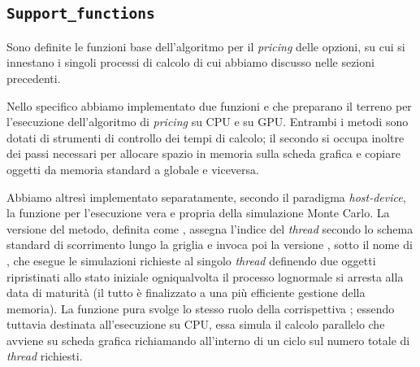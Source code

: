 \subsection{\texttt{Support\_functions}}
\label{sec:support_functions}
Sono definite  le funzioni base dell'algoritmo per il \textit{pricing} delle opzioni, su cui si innestano i singoli processi di calcolo di cui abbiamo discusso nelle sezioni precedenti.

Nello specifico abbiamo implementato due funzioni   e  che preparano il terreno per l'esecuzione dell'algoritmo di \textit{pricing} su CPU e su GPU. Entrambi i metodi sono dotati di strumenti di controllo dei tempi di calcolo; il secondo si occupa inoltre dei passi necessari per allocare spazio in memoria sulla scheda grafica e copiare oggetti da memoria standard a globale e viceversa. 

Abbiamo altresì implementato separatamente, secondo il paradigma \textit{host-device}, la funzione per l'esecuzione vera e propria della simulazione Monte Carlo. La versione  del metodo, definita come , assegna l'indice del \textit{thread} secondo lo schema standard di scorrimento lungo la griglia e invoca poi la versione , sotto il nome di , che esegue le simulazioni richieste al singolo \textit{thread} definendo due oggetti  ripristinati allo stato iniziale ogniqualvolta il processo lognormale si arresta alla data di maturità (il tutto è finalizzato a una più efficiente gestione della memoria). La funzione  pura  svolge lo stesso ruolo della corrispettiva ; essendo tuttavia destinata all'esecuzione su CPU, essa simula il calcolo parallelo che avviene su scheda grafica richiamando  all'interno di un ciclo  sul numero totale di \textit{thread} richiesti.

